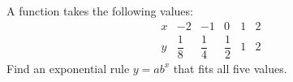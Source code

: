 A function takes the following values:
\[
\begin{array}{c|ccccc}
x&-2&-1&0&1&2\\\hline
y&\dfrac{1}{8}&\dfrac{1}{4}&\dfrac{1}{2}&1&2
\end{array}
\]
Find an exponential rule $y=ab^x$ that fits all five values.
